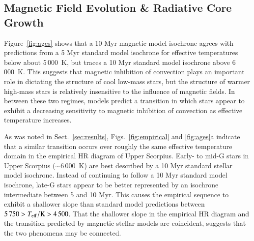 \documentclass{aa}
\begin{document}
\subsection{Magnetic Field Evolution \& Radiative Core Growth}
\label{sec:dynamo}
Figure~\ref{fig:ages} shows that a 10 Myr magnetic model isochrone agrees with predictions from a 5 Myr standard model isochrone for effective temperatures below about 5\,000~K, but traces a 10 Myr standard model isochrone above 6\,000~K. This suggests that magnetic inhibition of convection plays an important role in dictating the structure of cool low-mass stars, but the structure of warmer high-mass stars is relatively insensitive to the influence of magnetic fields. In between these two regimes, models predict a transition in which stars appear to exhibit a decreasing sensitivity to magnetic inhibition of convection as effective temperature increases.

As was noted in Sect.~\ref{sec:results}, Figs.~\ref{fig:empirical} and \ref{fig:ages}a indicate that a similar transition occurs over roughly the same effective temperature domain in the empirical HR diagram of Upper Scorpius. Early- to mid-G stars in Upper Scorpius (\teff$ \sim 6\,000$~K) are best described by a 10 Myr standard stellar model isochrone. Instead of continuing to follow a 10 Myr standard model isochrone, late-G stars appear to be better represented by an isochrone intermediate between 5 and 10 Myr. This causes the empirical sequence to exhibit a shallower slope than standard model predictions between $5\,750 > T_{\rm eff} / {\rm K} > 4\,500$. That the shallower slope in the empirical HR diagram and the transition predicted by magnetic stellar models are coincident, suggests that the two phenomena may be connected.
\end{document}
